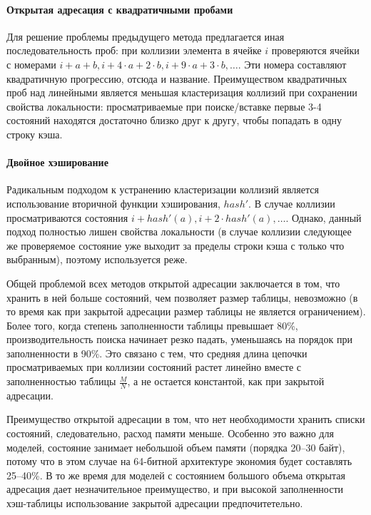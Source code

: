 \paragraph{Открытая адресация с квадратичными пробами}
\label{sec:open-quadratic-probing}

Для решение проблемы предыдущего метода предлагается иная последовательность проб: при
коллизии элемента в ячейке $i$ проверяются ячейки с номерами $i + a + b, i + 4 \cdot a + 2
\cdot b, i + 9 \cdot a + 3\cdot b, \ldots$. Эти номера составляют квадратичную прогрессию,
отсюда и название. Преимуществом квадратичных проб над линейными является меньшая
кластеризация коллизий при сохранении свойства локальности: просматриваемые при
поиске/вставке первые 3-4 состояний находятся достаточно близко друг к другу, чтобы
попадать в одну строку кэша.

\paragraph{Двойное хэширование}
\label{sec:open-double-hashing}

Радикальным подходом к устранению кластеризации коллизий является использование вторичной
функции хэширования, $hash'$. В случае коллизии просматриваются состояния $i + hash'(a), i
+ 2\cdot hash'(a), \ldots$. Однако, данный подход полностью лишен свойства локальности (в
случае коллизии следующее же проверяемое состояние уже выходит за пределы строки кэша
с только что выбранным), поэтому используется реже.

Общей проблемой всех методов открытой адресации заключается в том, что хранить в ней
больше состояний, чем позволяет размер таблицы, невозможно (в то время как при закрытой
адресации размер таблицы не является ограничением). Более того, когда степень
заполненности таблицы превышает 80\%, производительность поиска начинает резко падать,
уменьшаясь на порядок при заполненности в 90\%. Это связано с тем, что средняя длина
цепочки просматриваемых при коллизии состояний растет линейно вместе с заполненностью
таблицы $\frac{M}{N}$, а не остается константой, как при закрытой адресации.

Преимущество открытой адресации в том, что нет необходимости хранить списки состояний,
следовательно, расход памяти меньше. Особенно это важно для моделей, состояние занимает
небольшой объем памяти (порядка 20--30 байт), потому что в этом случае на 64-битной
архитектуре экономия будет составлять 25--40\%. В то же время для моделей с состоянием
большого объема открытая адресация дает незначительное преимущество, и при высокой
заполненности хэш-таблицы использование закрытой адресации предпочитетельно.

